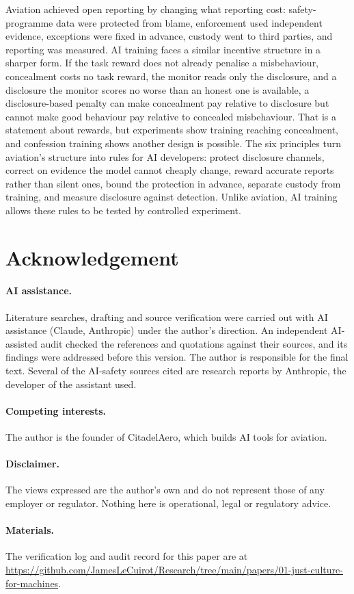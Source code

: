 \documentclass[11pt]{article}
\begin{document}
Aviation achieved open reporting by changing what reporting cost: safety-programme data were protected from blame, enforcement used independent evidence, exceptions were fixed in advance, custody went to third parties, and reporting was measured. AI training faces a similar incentive structure in a sharper form. If the task reward does not already penalise a misbehaviour, concealment costs no task reward, the monitor reads only the disclosure, and a disclosure the monitor scores no worse than an honest one is available, a disclosure-based penalty can make concealment pay relative to disclosure but cannot make good behaviour pay relative to concealed misbehaviour. That is a statement about rewards, but experiments show training reaching concealment, and confession training shows another design is possible. The six principles turn aviation's structure into rules for AI developers: protect disclosure channels, correct on evidence the model cannot cheaply change, reward accurate reports rather than silent ones, bound the protection in advance, separate custody from training, and measure disclosure against detection. Unlike aviation, AI training allows these rules to be tested by controlled experiment.

\section*{Acknowledgement}
\paragraph{AI assistance.} Literature searches, drafting and source verification were carried out with AI assistance (Claude, Anthropic) under the author's direction. An independent AI-assisted audit checked the references and quotations against their sources, and its findings were addressed before this version. The author is responsible for the final text. Several of the AI-safety sources cited are research reports by Anthropic, the developer of the assistant used.
\paragraph{Competing interests.} The author is the founder of CitadelAero, which builds AI tools for aviation.
\paragraph{Disclaimer.} The views expressed are the author's own and do not represent those of any employer or regulator. Nothing here is operational, legal or regulatory advice.
\paragraph{Materials.} The verification log and audit record for this paper are at \url{https://github.com/JamesLeCuirot/Research/tree/main/papers/01-just-culture-for-machines}.



\end{document}
